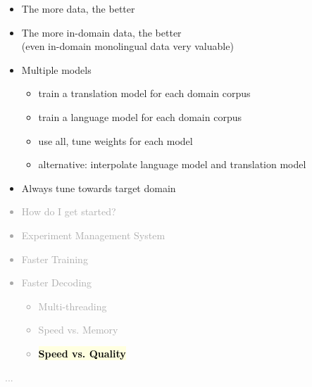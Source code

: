 \documentclass[landscape]{uedslides2C}
\newcommand{\currenttopic}[1]{\colorbox{lightyellow}{\textcolor{black}{\bf #1}}}
\begin{document}
\vspace{10mm}
\begin{itemize}
\item The more data, the better
\item The more in-domain data, the better\\
(even in-domain monolingual data very valuable)
\item Multiple models 
\begin{itemize}
\item train a translation model for each domain corpus
\item train a language model for each domain corpus
\item use all, tune weights for each model
\item alternative: interpolate language model and translation model
\end{itemize}
\item Always tune towards target domain
\end{itemize}



\vspace{-5mm}
\textcolor{darkgrey}{
\begin{itemize} \itemsep -1mm
\item {How do I get started?}
\item {Experiment Management System}
\item {Faster Training}
\item {Faster Decoding}
  \begin{itemize}
  \item {Multi-threading}
  \item {Speed vs. Memory}
  \item \currenttopic{Speed vs. Quality}
  \end{itemize}
\end{itemize}
...
}


\end{document}
